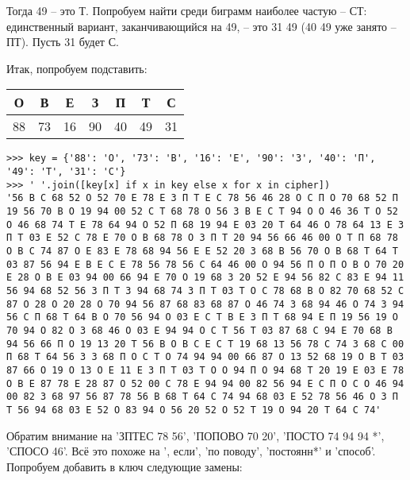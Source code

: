 \documentclass[letterpaper,11pt,openany]{book}
\begin{document}
Тогда 49 -- это Т. Попробуем найти среди биграмм наиболее частую -- СТ: единственный вариант, заканчивающийся на 49, -- это 31 49 (40 49 уже занято -- ПТ). Пусть 31 будет С.

Итак, попробуем подставить:

\medskip

{\centering
\begin{tabular}{||c|c|c|c|c|c|c||}
\hline
\textbf{О} & \textbf{В} & \textbf{Е} & \textbf{З} & \textbf{П} & \textbf{Т} & \textbf{С} \\
\hline
88 & 73 & 16 & 90 & 40 & 49 & 31  \\
\hline
\end{tabular}

}

\medskip

\begin{lstlisting}
>>> key = {'88': 'О', '73': 'В', '16': 'Е', '90': 'З', '40': 'П', '49': 'Т', '31': 'С'}
>>> ' '.join([key[x] if x in key else x for x in cipher])
'56 В С 68 52 О 52 70 Е 78 Е З П Т Е С 78 56 46 28 О С П О 70 68 52 П 19 56 70 В О 19 94 00 52 С Т 68 78 О 56 З В Е С Т 94 О О 46 36 Т О 52 О 46 68 74 Т Е 78 64 94 О 52 П 68 19 94 Е 03 20 Т 64 46 О 78 64 13 Е З П Т 03 Е 52 С 78 Е 70 О В 68 78 О З П Т 20 94 56 66 46 00 О Т П 68 78 О В С 74 87 О Е 83 Е 78 68 94 56 Е Е 52 20 З 68 В 56 70 О В 68 Т 64 Т 03 87 56 94 Е В Е С Е 78 56 78 56 С 64 46 00 О 94 56 П О П О В О 70 20 Е 28 О В Е 03 94 00 66 94 Е 70 О 19 68 З 20 52 Е 94 56 82 С 83 Е 94 11 56 94 68 52 56 З П Т З 94 68 74 З П Т 03 Т О С 78 68 В О 82 70 68 52 С 87 О 28 О 20 28 О 70 94 56 87 68 83 68 87 О 46 74 З 68 94 46 О 74 З 94 56 С П 68 Т 64 В О 70 56 94 О 03 Е С Т В Е З П Т 68 94 Е П 19 56 19 О 70 94 О 82 О З 68 46 О 03 Е 94 94 О С Т 56 Т 03 87 68 С 94 Е 70 68 В 94 56 66 П О 19 13 20 Т 56 В О В С Е С Т 19 68 13 56 78 С 74 З 68 С 00 П 68 Т 64 56 З З 68 П О С Т О 74 94 94 00 66 87 О 13 52 68 19 О В Т 03 87 66 О 19 О 13 О Е 11 Е З П Т 03 Т О О 94 П О 94 68 Т 20 19 Е 03 Е 78 О В Е 87 78 Е 28 87 О 52 00 С 78 Е 94 94 00 82 56 94 Е С П О С О 46 94 00 82 З 68 97 56 87 78 56 В 68 Т 64 С 74 94 68 03 Е 52 78 56 46 О З П Т 56 94 68 03 Е 52 О 83 94 О 56 20 52 О 52 Т 19 О 94 20 Т 64 С 74'
\end{lstlisting}

Обратим внимание на 'ЗПТЕС 78 56', 'ПОПОВО 70 20', 'ПОСТО 74 94 94 *', 'СПОСО 46'. Всё это похоже на ', если', 'по поводу', 'постоянн*' и 'способ'. Попробуем добавить в ключ следующие замены:

\medskip
\end{document}
